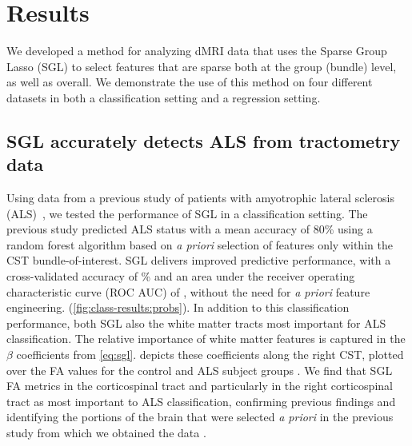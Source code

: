 \documentclass[10pt,letterpaper]{article}
\begin{document}
\section*{Results}

We developed a method for analyzing dMRI  data that uses the Sparse
Group Lasso (SGL) to select features that are sparse both at the group (bundle) level, as well as overall.
We demonstrate the use of this method on four different datasets in
both a classification setting and a regression setting.

\subsection*{SGL accurately detects ALS from tractometry data}

Using data from a previous study of patients with amyotrophic lateral sclerosis (ALS)~\cite{sarica2017corticospinal}, we tested the performance of SGL in a
classification setting. The previous study predicted ALS status with a mean
accuracy of 80\% using a random forest algorithm based on \emph{a priori}
selection of features only within the CST bundle-of-interest.
SGL delivers improved predictive performance, with a cross-validated accuracy
of {\alsAccuracy}\% and an area under the receiver operating characteristic
curve (ROC AUC) of {\alsRocAuc}, without the need for \emph{a priori} feature
engineering.
(\cref{fig:class-results:probs}). In addition to this classification
performance, both SGL  also 
the white matter tracts most important for ALS classification.
The relative importance of white matter
features is captured in the $\beta$ coefficients from \cref{eq:sgl}.
 depicts these coefficients along the
right CST, plotted over the FA values for the control and ALS subject groups .
We find that SGL  FA metrics in the corticospinal tract and
particularly in the right corticospinal tract as most important to ALS
classification, confirming previous findings \cite{van2011upper,
toosy2003diffusion, sarica2014tractography, sage2007quantitative,
sage2009quantitative, karlsborg2004corticospinal, ellis1999diffusion,
cosottini2005diffusion, ciccarelli2009investigation, abe2010voxel} and
identifying the portions of the brain that were selected \emph{a priori} in
the previous study from which we obtained the data
\cite{sarica2017corticospinal}.
\end{document}
